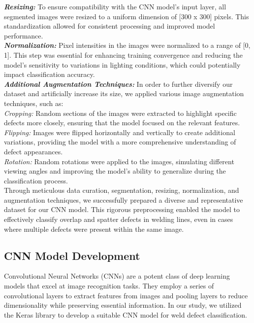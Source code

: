\documentclass{article_saj}
\begin{document}
\indent    
\textbf{\textit{Resizing:}} To ensure compatibility with the CNN model's input layer, all segmented images were resized to a uniform dimension of [300 x 300] pixels. This standardization allowed for consistent processing and improved model performance.\\

\indent
\textbf{\textit{Normalization:}} Pixel intensities in the images were normalized to a range of [0, 1]. This step was essential for enhancing training convergence and reducing the model's sensitivity to variations in lighting conditions, which could potentially impact classification accuracy.\\


\indent
\textbf{\textit{Additional Augmentation Techniques:}} In order to further diversify our dataset and artificially increase its size, we applied various image augmentation techniques, such as:\\

\indent 
\textit{Cropping:} Random sections of the images were extracted to highlight specific defects more closely, ensuring that the model focused on the relevant features.\\

\indent 
\textit{Flipping:} Images were flipped horizontally and vertically to create additional variations, providing the model with a more comprehensive understanding of defect appearances.\\

\indent 
\textit{Rotation:} Random rotations were applied to the images, simulating different viewing angles and improving the model's ability to generalize during the classification process.\\

Through meticulous data curation, segmentation, resizing, normalization, and augmentation techniques, we successfully prepared a diverse and representative dataset for our CNN model. This rigorous preprocessing enabled the model to effectively classify overlap and spatter defects in welding lines, even in cases where multiple defects were present within the same image.\\


\subsection{CNN Model Development}

\indent Convolutional Neural Networks (CNNs) are a potent class of deep learning models that excel at image recognition tasks. They employ a series of convolutional layers to extract features from images and pooling layers to reduce dimensionality while preserving essential information. In our study, we utilized the Keras library to develop a suitable CNN model for weld defect classification.\\
\end{document}
